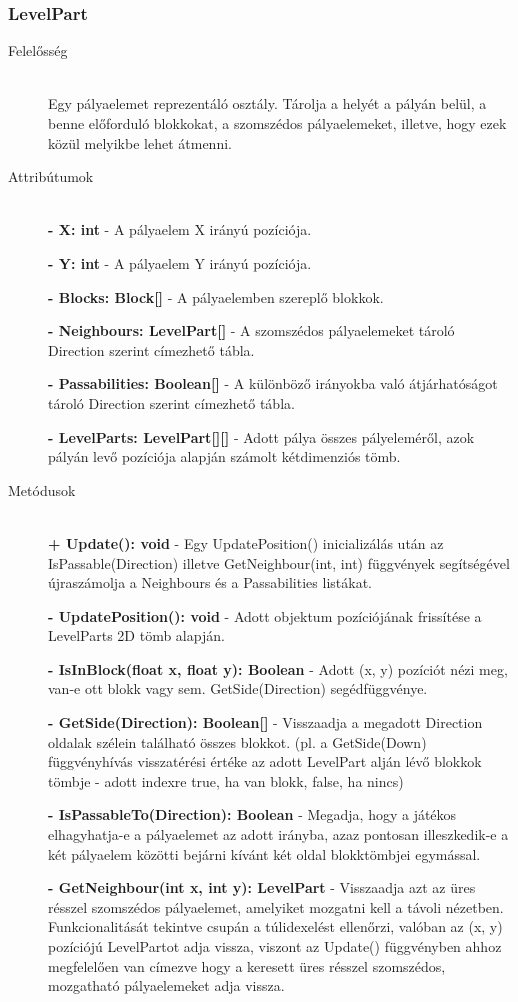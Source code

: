 \subsubsection{LevelPart}
	\begin{description}
		\item[Felelősség] \hfill \\
		Egy pályaelemet reprezentáló osztály. Tárolja a helyét a pályán belül, a benne előforduló blokkokat, a szomszédos pályaelemeket, illetve, hogy ezek közül melyikbe lehet átmenni.

		\item[Attribútumok]\hfill \\		
		\textbf{- X: int} - A pályaelem X irányú pozíciója.
		
		\textbf{- Y: int} - A pályaelem Y irányú pozíciója.
		
		\textbf{- Blocks: Block[]} - A pályaelemben szereplő blokkok.
		
		\textbf{- Neighbours: LevelPart[]} - A szomszédos pályaelemeket tároló Direction szerint címezhető tábla.
		
		\textbf{- Passabilities: Boolean[]} - A különböző irányokba való átjárhatóságot tároló Direction szerint címezhető tábla.

		\textbf{- LevelParts: LevelPart[][]} - Adott pálya összes pályeleméről, azok pályán levő pozíciója alapján számolt kétdimenziós tömb.
		
		\item[Metódusok]\hfill \\
		\textbf{+ Update(): void} - Egy UpdatePosition() inicializálás után az IsPassable(Direction) illetve GetNeighbour(int, int) függvények segítségével újraszámolja a Neighbours és a Passabilities listákat.

		\textbf{- UpdatePosition(): void} - Adott objektum pozíciójának frissítése a LevelParts 2D tömb alapján.

		\textbf{- IsInBlock(float x, float y): Boolean} - Adott (x, y) pozíciót nézi meg, van-e ott blokk vagy sem. GetSide(Direction) segédfüggvénye.

		\textbf{- GetSide(Direction): Boolean[]} - Visszaadja a megadott Direction oldalak szélein található összes blokkot. (pl. a GetSide(Down) függvényhívás visszatérési értéke az adott LevelPart alján lévő blokkok tömbje - adott indexre true, ha van blokk, false, ha nincs)

		\textbf{- IsPassableTo(Direction): Boolean} - Megadja, hogy a játékos elhagyhatja-e a pályaelemet az adott irányba, azaz pontosan illeszkedik-e a két pályaelem közötti bejárni kívánt két oldal blokktömbjei egymással.

		\textbf{- GetNeighbour(int x, int y): LevelPart} - Visszaadja azt az üres résszel szomszédos pályaelemet, amelyiket mozgatni kell a távoli nézetben. Funkcionalitását tekintve csupán a túlidexelést ellenőrzi, valóban az (x, y) pozíciójú LevelPartot adja vissza, viszont az Update() függvényben ahhoz megfelelően van címezve hogy a keresett üres résszel szomszédos, mozgatható pályaelemeket adja vissza.

	\end{description}
	
